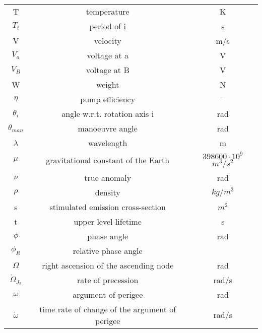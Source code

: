 \begin{longtable}{c|c|c}
         T & temperature &          K \\

        $T_i$ & period of i &          s \\

         V &   velocity &        m/s \\

        $V_a$ & voltage at a &          V \\

        $V_B$ & voltage at B &          V \\

         W &     weight &          N \\

         $\eta$ & pump efficiency &          $-$ \\

        $\theta _i$ & angle w.r.t. rotation axis i &        rad \\

      $\theta _{man}$ & manoeuvre angle &        rad \\

         $\lambda$ & wavelength &          m \\

         $\mu$ & gravitational constant of the Earth & $398600\cdot 10^9$ $m^3/s^2$ \\

         $\nu$ & true anomaly &        rad \\

         $\rho$ &    density &      $kg/m^3$ \\

         s & stimulated emission cross-section &         $m^2$ \\

         t & upper level lifetime &          s \\

         $\phi$ & phase angle &        rad \\

        $\phi _R$ & relative phase angle &            \\

         $\Omega$  & right ascension of the ascending node &        rad \\

$\dot \Omega _{J_2 }$ & rate of precession &      rad/s \\

         $\omega$ & argument of perigee &        rad \\

$\dot \omega$ & time rate of change of the argument of perigee &      rad/s\\
 
\end{longtable}